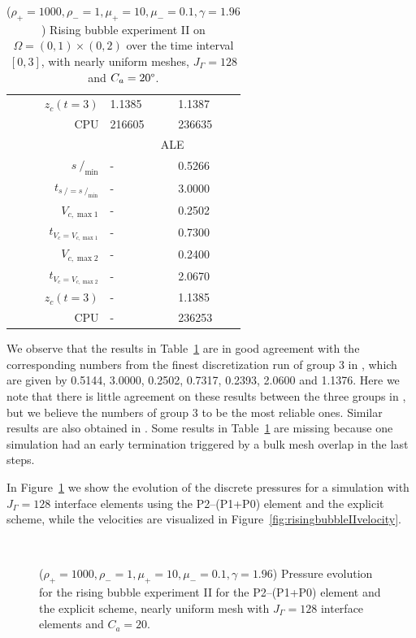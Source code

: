 \documentclass[a4paper,12pt,onecolumn]{article}
\newcommand{\strikes}{\mbox{$s\!\!\!\!\:/$}}
\begin{document}
\begin{table}
\begin{tabular}{rll}
$z_c(t=3)$                       & 1.1385 & 1.1387 \\
CPU                              & 216605 & 236635 \\
\cmidrule{2-3}
& \multicolumn{2}{c}{ALE} \\
\cmidrule{2-3}
$\strikes_{\min}$                & - & 0.5266 \\
$t_{\strikes = \strikes_{\min}}$ & - & 3.0000 \\
$V_{c,\max 1}$                   & - & 0.2502 \\
$t_{V_c = V_{c,\max 1}}$         & - & 0.7300 \\
$V_{c,\max 2}$                   & - & 0.2400 \\
$t_{V_c = V_{c,\max 2}}$         & - & 2.0670 \\
$z_c(t=3)$                       & - & 1.1385 \\
CPU                              & - & 236253 \\
\hline
\end{tabular}
\hspace*{-3.25cm}
\caption[Navier--Stokes rising bubble II benchmark values]
{($\rho_+ = 1000,\rho_- = 1,\mu_+ = 10,\mu_- =0.1,\gamma = 1.96$)
Rising bubble experiment II on $\Omega = (0,1) \times (0,2)$ over the time
interval $[0,3]$, with nearly uniform meshes, $J_\Gamma=128$ and
$C_a=20\degree$.}
\label{tab:risingbubbleII}
\end{table}
We observe that the results in Table~\ref{tab:risingbubbleII}
are in good agreement with the corresponding numbers from the finest
discretization run of group 3 in \cite{HysingTKPBGT09}, which are given by
0.5144, 3.0000, 0.2502, 0.7317, 0.2393, 2.0600 and 1.1376. Here we note that
there is little agreement on these results between the three groups in
\cite{HysingTKPBGT09}, but we believe the numbers of group 3 to be the most
reliable ones. Similar results are also obtained in \cite{fluidfbp}. Some
results in Table~\ref{tab:risingbubbleII} are missing because one simulation
had an early termination triggered by a bulk mesh overlap in the last steps.

In Figure~\ref{fig:risingbubbleIIpressure} we show the evolution of the discrete
pressures for a simulation with $J_\Gamma=128$ interface elements using the
P2--(P1+P0) element and the explicit scheme, while the velocities are visualized
in Figure~\ref{fig:risingbubbleIIvelocity}.
\begin{figure}[htbp]
\centering
{}
\\
\caption[Navier--Stokes rising bubble II pressure]
{($\rho_+ = 1000,\rho_- = 1,\mu_+ = 10,\mu_- =0.1,\gamma = 1.96$)
Pressure evolution for the rising bubble experiment II for the P2--(P1+P0)
element and the explicit scheme, nearly uniform mesh with $J_\Gamma=128$
interface elements and $C_a=20$\textdegree.}
\label{fig:risingbubbleIIpressure}
\end{figure}
\end{document}
